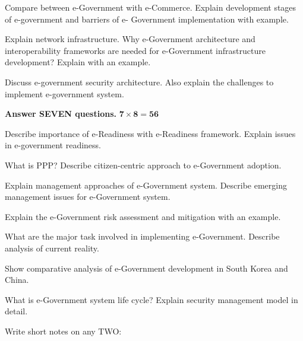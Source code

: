 \documentclass[a4paper, twoside, 12pt, noanswers]{exam}
\begin{document}
\begin{questions}

	\question[3+5+4] Compare between e-Government with e-Commerce. Explain development stages of e-government and barriers of e-
	Government implementation with example.
	
	\question[4+8] Explain network infrastructure. Why e-Government architecture and interoperability frameworks are needed for e-Government infrastructure development? Explain with an example.
	
	\question[8+4] Discuss e-government security architecture. Also explain the challenges to implement e-government system.

	

{\par}
{\hspace*{-0.5cm}\noindent\bfseries Answer SEVEN questions.} \hfill {\( \mathbf{7 \times 8 = 56}\)}

\question[4+4] Describe importance of e-Readiness with e-Readiness framework. Explain issues in e-government readiness. 

\question[2+6] What is PPP? Describe citizen-centric approach to e-Government adoption. 

\question[4+4] Explain management approaches of e-Government system. Describe emerging management issues for e-Government system. 

\question[8] Explain the e-Government risk assessment and mitigation with an example.

\question[4+4] What are the major task involved in implementing e-Government. Describe analysis of current reality.

\question[8] Show comparative analysis of e-Government development in South Korea and China.

\question[3+5] What is e-Government system life cycle? Explain security management model in detail.

\question[4+4] Write short notes on any TWO:

\end{questions}
\newpage
\end{document}
